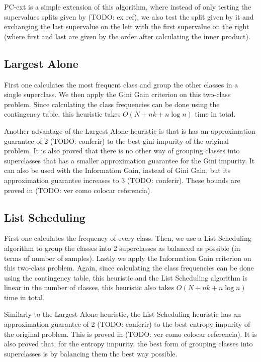 PC-ext is a simple extension of this algorithm, where instead of only testing the supervalues splits given by (TODO: ex ref), we also test the split given by it and exchanging the last supervalue on the left with the first supervalue on the right (where first and last are given by the order after calculating the inner product).

\subsection{Largest Alone}
First one calculates the most frequent class and group the other classes in a single superclass. We then apply the Gini Gain criterion on this two-class problem. Since calculating the class frequencies can be done using the contingency table, this heuristic takes $O(N + n k + n \log n)$ time in total.

Another advantage of the Largest Alone heuristic is that is has an approximation guarantee of 2 (TODO: conferir) to the best gini impurity of the original problem. It is also proved that there is no other way of grouping classes into superclasses that has a smaller approximation guarantee for the Gini impurity. It can also be used with the Information Gain, instead of Gini Gain, but its approximation guarantee increases to 3 (TODO: conferir). These bounds are proved in (TODO: ver como colocar referencia).

\subsection{List Scheduling}
First one calculates the frequency of every class. Then, we use a List Scheduling algorithm to group the classes into 2 superclasses as balanced as possible (in terms of number of samples). Lastly we apply the Information Gain criterion on this two-class problem. Again, since calculating the class frequencies can be done using the contingency table, this heuristic and the List Scheduling algorithm is linear in the number of classes, this heuristic also takes $O(N + n k + n \log n)$ time in total.

Similarly to the Largest Alone heuristic, the List Scheduling heuristic has an approximation guarantee of 2 (TODO: conferir) to the best entropy impurity of the original problem. This is proved in (TODO: ver como colocar referencia). It is also proved that, for the entropy impurity, the best form of grouping classes into superclasses is by balancing them the best way possible.
